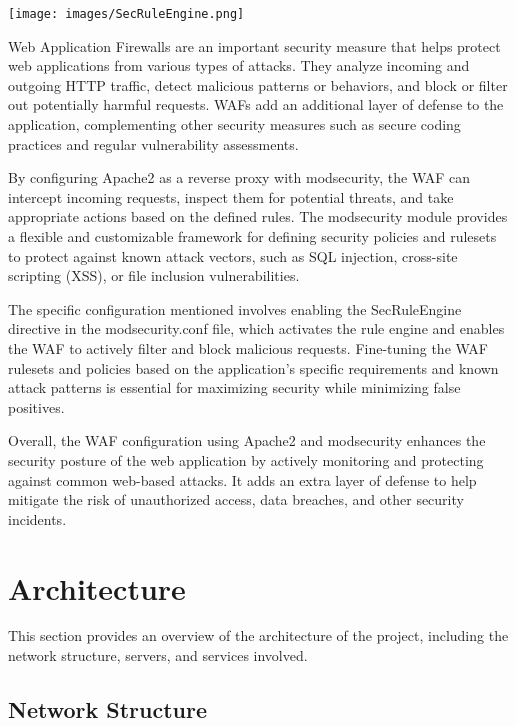 \documentclass[12pt]{article}
\begin{document}
\begin{center}
    \texttt{[image: images/SecRuleEngine.png]}
\end{center}

Web Application Firewalls are an important security measure that helps protect web applications from various types of attacks. They analyze incoming and outgoing HTTP traffic, detect malicious patterns or behaviors, and block or filter out potentially harmful requests. WAFs add an additional layer of defense to the application, complementing other security measures such as secure coding practices and regular vulnerability assessments.

By configuring Apache2 as a reverse proxy with mod\textunderscore security, the WAF can intercept incoming requests, inspect them for potential threats, and take appropriate actions based on the defined rules. The mod\textunderscore security module provides a flexible and customizable framework for defining security policies and rulesets to protect against known attack vectors, such as SQL injection, cross-site scripting (XSS), or file inclusion vulnerabilities.

The specific configuration mentioned involves enabling the SecRuleEngine directive in the modsecurity.conf file, which activates the rule engine and enables the WAF to actively filter and block malicious requests. Fine-tuning the WAF rulesets and policies based on the application's specific requirements and known attack patterns is essential for maximizing security while minimizing false positives.

Overall, the WAF configuration using Apache2 and mod\textunderscore security enhances the security posture of the web application by actively monitoring and protecting against common web-based attacks. It adds an extra layer of defense to help mitigate the risk of unauthorized access, data breaches, and other security incidents.


\newpage
\section{Architecture}

This section provides an overview of the architecture of the project, including the network structure, servers, and services involved.


\subsection{Network Structure}
\end{document}
